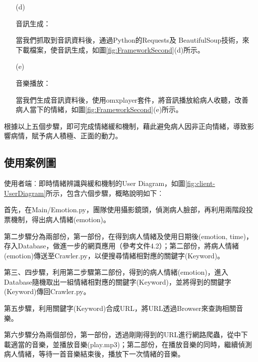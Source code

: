 \documentclass[12pt]{scrreprt}
\begin{document}
\begin{itemize}
\begin{itemize}
\item[(d)]{\begin{bfseries}{音訊生成：}\end{bfseries}}

當我們抓取到音訊資料後，通過Python的Requests及 BeautifulSoup技術，來下載檔案，使音訊生成，如圖\ref{fig:FrameworkSecond}(d)所示。

\item[(e)]{\begin{bfseries}{音樂播放：}\end{bfseries}}

當我們生成音訊資料後，使用omxplayer套件，將音訊播放給病人收聽，改善病人當下的情緒，如圖\ref{fig:FrameworkSecond}(e)所示。

\end{itemize}

根據以上五個步驟，即可完成情緒緩和機制，藉此避免病人因非正向情緒，導致影響病情，賦予病人積極、正面的動力。
\end{itemize}



\subsection{使用案例圖} %

使用者端︰即時情緒辨識與緩和機制的User Diagram，如圖\ref{fig:client-UserDiagram}所示，包含六個步驟，概略說明如下︰



首先，在Main/Emotion.py，團隊使用攝影鏡頭，偵測病人臉部，再利用兩階段投票機制，得出病人情緒(emotion)。

第二步驟分為兩部份，第一部份，在得到病人情緒及使用日期後(emotion, time)，存入Database，做進一步的網頁應用（參考文件4.2）；第二部份，將病人情緒(emotion)傳送至Crawler.py，以便搜尋情緒相對應的關鍵字(Keyword)。

第三、四步驟，利用第二步驟第二部份，得到的病人情緒(emotion)，進入Database隨機取出一組情緒相對應的關鍵字(Keyword)，並將得到的關鍵字(Keyword)傳回Crawler.py。

第五步驟，利用關鍵字(Keyword)合成URL，將URL透過Browser來查詢相關音樂。

第六步驟分為兩個部份，第一部份，透過剛剛得到的URL進行網路爬蟲，從中下載適當的音樂，並播放音樂(play.mp3)；第二部份，在播放音樂的同時，繼續偵測病人情緒，等待一首音樂結束後，播放下一次情緒的音樂。
\end{document}
